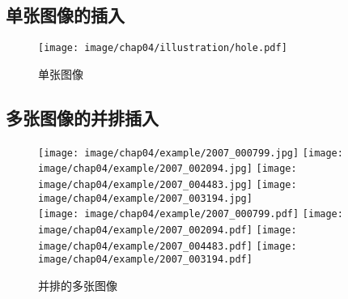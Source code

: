 \subsection{单张图像的插入}

\begin{figure}[h]
    \centering
    \texttt{[image: image/chap04/illustration/hole.pdf]}
    \caption{单张图像}
    \label{fig:hole}
\end{figure}


\subsection{多张图像的并排插入}


\begin{figure}[h!]%
    \centering
    \texttt{[image: image/chap04/example/2007\_000799.jpg]}
    \texttt{[image: image/chap04/example/2007\_002094.jpg]}
    \texttt{[image: image/chap04/example/2007\_004483.jpg]}
    \texttt{[image: image/chap04/example/2007\_003194.jpg]}
    \\
    \texttt{[image: image/chap04/example/2007\_000799.pdf]}
    \texttt{[image: image/chap04/example/2007\_002094.pdf]}
    \texttt{[image: image/chap04/example/2007\_004483.pdf]}
    \texttt{[image: image/chap04/example/2007\_003194.pdf]}
    \caption{并排的多张图像}
    \label{fig:multi-image-example1}
\end{figure}


